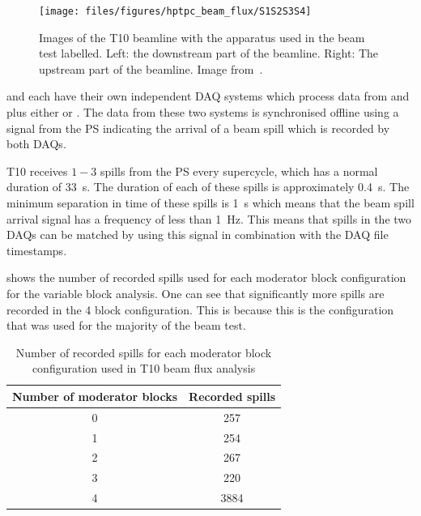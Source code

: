 \begin{figure}[h]
  \centering
  \texttt{[image: files/figures/hptpc\_beam\_flux/S1S2S3S4]}
  \caption[Images of the test beam setup with various objects labelled]{Images of the T10 beamline with the apparatus used in the beam test labelled. Left: the downstream part of the beamline. Right: The upstream part of the beamline. Image from~\cite{beampaper}.}
  \label{fig:beamlinePics}
\end{figure}

\SThree and \SFour each have their own independent DAQ systems which process data from \SOne and \STwo plus either \SThree or \SFour.
The data from these two systems is synchronised offline using a signal from the PS indicating the arrival of a beam spill which is recorded by both DAQs.

T10 receives $1-3$ spills from the PS every supercycle, which has a normal duration of \SI{33}{\second}.
The duration of each of these spills is approximately \SI{0.4}{\second}.
The minimum separation in time of these spills is \SI{1}{\second} which means that the beam spill arrival signal has a frequency of less than \SI{1}{\hertz}.
This means that spills in the two DAQs can be matched by using this signal in combination with the DAQ file timestamps.

 shows the number of recorded spills used for each moderator block configuration for the variable block analysis.
One can see that significantly more spills are recorded in the 4 block configuration.
This is because this is the configuration that was used for the majority of the beam test.

\begin{table}
  \caption[Number of recorded spills for each moderator block configuration used in T10 beam flux analysis]{Number of recorded spills for each moderator block configuration used in T10 beam flux analysis}
  \label{tab:nSpills}
  \begin{tabular}{c c}
    \hline
    \hline
    Number of moderator blocks & Recorded spills \\
    \hline
    0 & 257 \\
    1 & 254 \\
    2 & 267 \\
    3 & 220 \\
    4 & 3884 \\
    \hline
  \end{tabular}
\end{table}

